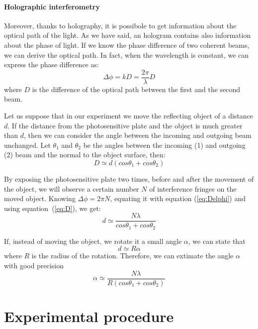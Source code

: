 \documentclass[11pt,a4paper]{article}
\begin{document}
\paragraph{Holographic interferometry}
Moreover, thanks to holography, it is possibole to get information about the optical path of the light. As we have said, an hologram contains also information about the phase of light. If we know the phase difference of two coherent beams, we can derive the optical path. In fact, when the wavelength is constant, we can express the phase difference as:
\begin{equation}
\Delta \phi=kD=\frac{2\pi}{\lambda}D\label{eq:Delphi}
\end{equation}
where $D$ is the difference of the optical path between the first and the second beam.

Let us suppose that in our experiment we move the reflecting object of a distance $d$. If the distance from the photosensitive plate and the object is much greater than $d$, then we can consider the angle between the incoming and outgoing beam unchanged. Let $\theta_1$ and $\theta_2$ be the angles between the incoming (1) and outgoing (2) beam and the normal to the object surface, then: 
\begin{equation}
D\simeq d(cos\theta_1+cos\theta_2)\label{eq:D}
\end{equation}

By exposing the photosensitive plate two times, before and after the movement of the object, we will observe a certain number $N$ of interference fringes on the moved object. Knowing $\Delta \phi=2\pi N$, equating it with equation (\ref{eq:Delphi}) and using equation~(\ref{eq:D}), we get:
\begin{equation}
d\simeq\frac{N\lambda}{cos\theta_1+cos\theta_2}\label{eq:d}
\end{equation}

If, instead of moving the object, we rotate it a small angle $\alpha$, we can state that
\begin{equation}
d\simeq R\alpha
\end{equation}
where $R$ is the radius of the rotation. Therefore, we can extimate the angle $\alpha$ with good precision
\begin{equation}
\alpha\simeq \frac{N\lambda}{R(cos\theta_1+cos\theta_2)}\label{eq:alp}
\end{equation}

\section{Experimental procedure}
\end{document}
